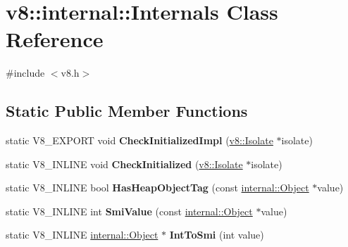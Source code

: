 \hypertarget{classv8_1_1internal_1_1_internals}{}\section{v8\+:\+:internal\+:\+:Internals Class Reference}
\label{classv8_1_1internal_1_1_internals}


{\ttfamily \#include $<$v8.\+h$>$}

\subsection*{Static Public Member Functions}
\begin{DoxyCompactItemize}
\item 
static V8\+\_\+\+E\+X\+P\+O\+RT void {\bfseries Check\+Initialized\+Impl} (\hyperlink{classv8_1_1_isolate}{v8\+::\+Isolate} $\ast$isolate)\hypertarget{classv8_1_1internal_1_1_internals_ac5141eba7a786f0fa9f6db658f25d4ba}{}\label{classv8_1_1internal_1_1_internals_ac5141eba7a786f0fa9f6db658f25d4ba}

\item 
static V8\+\_\+\+I\+N\+L\+I\+NE void {\bfseries Check\+Initialized} (\hyperlink{classv8_1_1_isolate}{v8\+::\+Isolate} $\ast$isolate)\hypertarget{classv8_1_1internal_1_1_internals_a1aa4bc86bc011f055fe27d18e0849b8c}{}\label{classv8_1_1internal_1_1_internals_a1aa4bc86bc011f055fe27d18e0849b8c}

\item 
static V8\+\_\+\+I\+N\+L\+I\+NE bool {\bfseries Has\+Heap\+Object\+Tag} (const \hyperlink{classv8_1_1internal_1_1_object}{internal\+::\+Object} $\ast$value)\hypertarget{classv8_1_1internal_1_1_internals_aece7d6117172e0ded0d21774e460cc28}{}\label{classv8_1_1internal_1_1_internals_aece7d6117172e0ded0d21774e460cc28}

\item 
static V8\+\_\+\+I\+N\+L\+I\+NE int {\bfseries Smi\+Value} (const \hyperlink{classv8_1_1internal_1_1_object}{internal\+::\+Object} $\ast$value)\hypertarget{classv8_1_1internal_1_1_internals_ad00a8fac1a3b75795d4036eae8e8ccfb}{}\label{classv8_1_1internal_1_1_internals_ad00a8fac1a3b75795d4036eae8e8ccfb}

\item 
static V8\+\_\+\+I\+N\+L\+I\+NE \hyperlink{classv8_1_1internal_1_1_object}{internal\+::\+Object} $\ast$ {\bfseries Int\+To\+Smi} (int value)\hypertarget{classv8_1_1internal_1_1_internals_a9e5ab52581c9c32ac018fb1cc98ab5fa}{}\label{classv8_1_1internal_1_1_internals_a9e5ab52581c9c32ac018fb1cc98ab5fa}


\end{DoxyCompactItemize}
